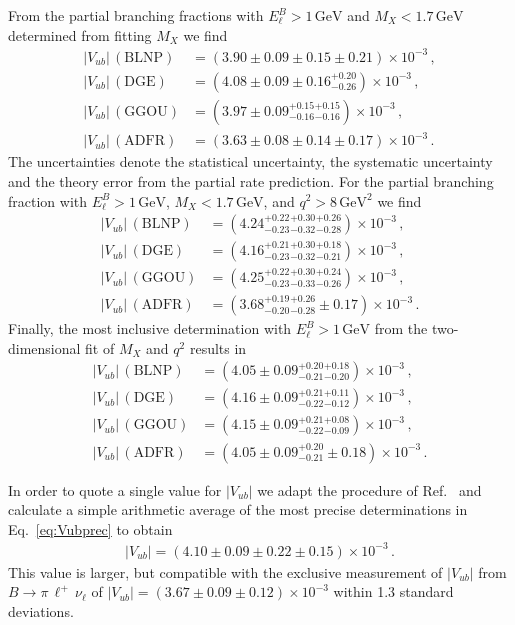 \documentclass[twocolumn,aps,prd,superscriptaddress,nofootinbib,floatfix,preprintnumbers,a4]{revtex4-1}
\newcommand{\nn}{\nonumber}
\newcommand{\Vub}{V_{ub}}
\newcommand{\bfResAverageVuba}{\ensuremath{\left| V_{ub} \right| = \left( 4.10 \pm 0.09  \pm 0.22 \pm 0.15  \right) \times 10^{-3}}\xspace}
\newcommand{\bfResBLNPVuba}{\ensuremath{ \left( 3.90 \pm 0.09  \pm 0.15  \pm 0.21 \right) \times 10^{-3}}\xspace}
\newcommand{\bfResBLNPVubb}{\ensuremath{\left( 4.24  {}^{+0.22}_{-0.23}  {}^{+0.30}_{-0.32} {}^{+0.26}_{-0.28} \right) \times 10^{-3}}\xspace}
\newcommand{\bfResBLNPVubd}{\ensuremath{ \left( 4.05 \pm 0.09 {}^{+0.20}_{-0.21} {}^{+0.18}_{-0.20} \right) \times 10^{-3}}\xspace}
\newcommand{\bfResDGEVuba}{\ensuremath{ \left( 4.08 \pm 0.09  \pm 0.16 {}^{+0.20}_{-0.26} \right) \times 10^{-3}}\xspace}
\newcommand{\bfResDGEVubb}{\ensuremath{ \left( 4.16 {}^{+0.21}_{-0.23} {}^{+0.30}_{-0.32}{}^{+0.18}_{-0.21} \right) \times 10^{-3}}\xspace}
\newcommand{\bfResDGEVubd}{\ensuremath{ \left( 4.16  \pm 0.09  {}^{+0.21}_{-0.22}  {}^{+0.11}_{-0.12} \right) \times 10^{-3}}\xspace}
\newcommand{\bfResGGOUVuba}{\ensuremath{ \left( 3.97 \pm 0.09  {}^{+0.15}_{-0.16} {}^{+0.15}_{-0.16} \right) \times 10^{-3}}\xspace}
\newcommand{\bfResGGOUVubb}{\ensuremath{ \left( 4.25 {}^{+0.22}_{-0.23} {}^{+0.30}_{-0.33} {}^{+0.24}_{-0.26} \right) \times 10^{-3}}\xspace}
\newcommand{\bfResGGOUVubd}{\ensuremath{ \left( 4.15  \pm 0.09   {}^{+0.21}_{-0.22}  {}^{+0.08}_{-0.09} \right) \times 10^{-3}}\xspace}
\newcommand{\bfResADFRVuba}{\ensuremath{ \left( 3.63 \pm 0.08 \pm 0.14 \pm 0.17 \right) \times 10^{-3}}\xspace}
\newcommand{\bfResADFRVubb}{\ensuremath{\left( 3.68 {}^{+0.19}_{-0.20}  {}^{+0.26}_{-0.28} \pm 0.17 \right) \times 10^{-3}}\xspace}
\newcommand{\bfResADFRVubd}{\ensuremath{ \left( 4.05 \pm 0.09  {}^{+0.20}_{-0.21}\pm 0.18 \right) \times 10^{-3}}\xspace}
\newcommand{\bpilnu}{\ensuremath{B \to \pi \, \ell^+\,\nu_{\ell}}\xspace}
\begin{document}
From the partial branching fractions with $E_\ell^B > 1 \, \text{GeV}$ and $M_X < 1.7 \, \text{GeV}$ determined from fitting $M_X$ we find
\begin{align}
\left|\Vub\right| \, (\mathrm{BLNP}) & = \bfResBLNPVuba \, , \nn \\
\left|\Vub\right| \, (\mathrm{DGE}) & = \bfResDGEVuba \, , \nn \\
\left|\Vub\right| \, (\mathrm{GGOU}) & = \bfResGGOUVuba \, , \nn \\
\left|\Vub\right| \, (\mathrm{ADFR}) & = \bfResADFRVuba \, . 
\end{align}
The uncertainties denote the statistical uncertainty, the systematic uncertainty and the theory error from the partial rate prediction. 
For the partial branching fraction with  $E_\ell^B > 1 \, \text{GeV}$, $M_X < 1.7 \, \text{GeV}$, and $q^2 > 8 \, \text{GeV}^2$ we find
\begin{align}
\left|\Vub\right| \, (\mathrm{BLNP}) & = \bfResBLNPVubb \, , \nn \\
\left|\Vub\right| \, (\mathrm{DGE}) & = \bfResDGEVubb \, , \nn \\
\left|\Vub\right| \, (\mathrm{GGOU}) & = \bfResGGOUVubb \, , \nn \\
\left|\Vub\right| \, (\mathrm{ADFR}) & = \bfResADFRVubb \, . 
\end{align}
Finally, the most inclusive determination with $E_\ell^B > 1 \, \text{GeV}$ from the two-dimensional fit of $M_X$ and $q^2$ results in
\begin{align}
\left|\Vub\right| \, (\mathrm{BLNP}) & = \bfResBLNPVubd \, , \nn \\
\left|\Vub\right| \, (\mathrm{DGE}) & = \bfResDGEVubd \, , \nn \\
\left|\Vub\right| \, (\mathrm{GGOU}) & = \bfResGGOUVubd \, , \nn \\
\left|\Vub\right| \, (\mathrm{ADFR}) & = \bfResADFRVubd \, .  \label{eq:Vubprec}
\end{align}

In order to quote a single value for $|V_{ub}|$ we adapt the procedure of Ref.~\cite{pdg_Vxb:2020} and calculate a simple arithmetic average of the most precise determinations in Eq.~\ref{eq:Vubprec} to obtain
\begin{align}
 \bfResAverageVuba \, .
\end{align}
This value is larger, but compatible with the exclusive measurement of $|\Vub|$ from \bpilnu of \mbox{$\left|\Vub\right| = \left(3.67 \pm 0.09 \pm 0.12 \right) \times 10^{-3}$} within 1.3 standard deviations.
\end{document}
